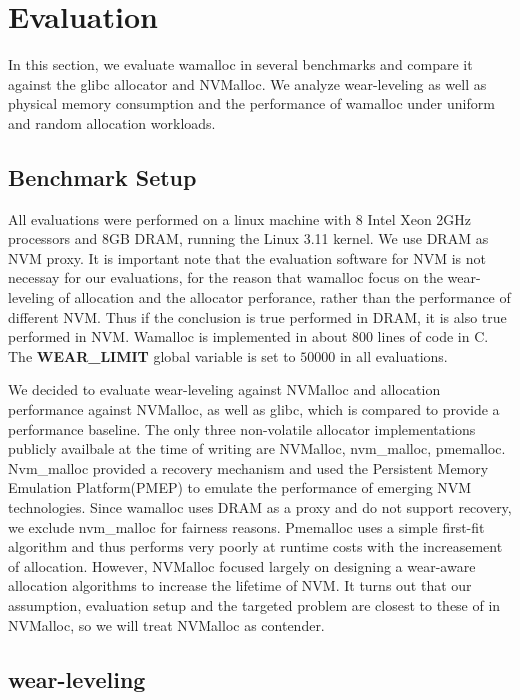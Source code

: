 \documentclass{vldb}
\begin{document}
\section{Evaluation}

In this section, we evaluate wamalloc in several benchmarks and compare it against the glibc allocator and NVMalloc\cite{moraru2013consistent}.
We analyze wear-leveling as well as physical memory consumption and the performance of wamalloc under uniform and random allocation workloads.

\subsection{Benchmark Setup}

All evaluations were performed on a linux machine with 8 Intel Xeon 2GHz processors and 8GB DRAM, running the Linux 3.11 kernel.
We use DRAM as NVM proxy. It is important note that the evaluation software for NVM is not necessay for our evaluations, for the reason that wamalloc focus on the wear-leveling of allocation and the allocator perforance, rather than the performance of different NVM.
Thus if the conclusion is true performed in DRAM, it is also true performed in NVM.
Wamalloc is implemented in about 800 lines of code in C.
The \textbf{WEAR\_LIMIT} global variable is set to $50000$ in all evaluations.

We decided to evaluate wear-leveling against NVMalloc and allocation performance against NVMalloc, as well as glibc,
which is compared to provide a performance baseline. 
The only three non-volatile allocator implementations publicly availbale at the time of writing are NVMalloc, nvm\_malloc, pmemalloc.
Nvm\_malloc provided a recovery mechanism and used the Persistent Memory Emulation Platform(PMEP)\cite{dulloor2014system} to emulate the performance of emerging NVM technologies.
Since wamalloc uses DRAM as a proxy and do not support recovery, we exclude nvm\_malloc for fairness reasons.
Pmemalloc uses a simple first-fit algorithm and thus performs very poorly at runtime costs with the increasement of allocation.
However, NVMalloc focused largely on designing a wear-aware allocation algorithms to increase the lifetime of NVM.
It turns out that our assumption, evaluation setup and the targeted problem are closest to these of in NVMalloc, so we will treat NVMalloc as contender.

\subsection{wear-leveling}
\end{document}
